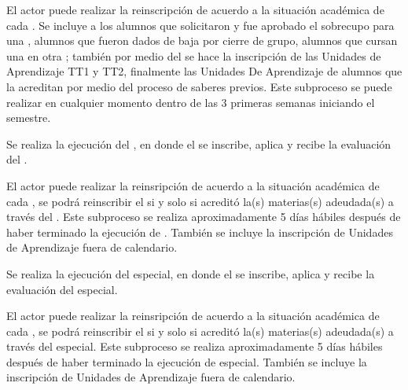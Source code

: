 \begin{PDescripcion}
\begin{enumerate}
		\Ppaso[\PSubProceso]  El actor puede realizar la reinscripción de acuerdo a la situación académica de cada . Se incluye a los alumnos que solicitaron y fue aprobado el sobrecupo para una , alumnos que fueron dados de baja por cierre de grupo, alumnos que cursan una  en otra ; también por medio del  se hace la inscripción de las Unidades de Aprendizaje TT1 y TT2, finalmente las Unidades De Aprendizaje de alumnos que la acreditan por medio del proceso de saberes previos. Este subproceso se puede realizar en cualquier momento dentro de las 3 primeras semanas iniciando el semestre. 
		
		\Ppaso[\PSubProceso]  Se realiza la ejecución del , en donde el  se inscribe, aplica y recibe la evaluación del . 
		
		\Ppaso[\PSubProceso]  El actor puede realizar la reinsripción de acuerdo a la situación académica de cada , se podrá reinscribir el  si y solo si acreditó la(s) materias(s) adeudada(s) a través del . Este subproceso se realiza aproximadamente 5 días hábiles después de haber terminado la ejecución de . También se incluye la inscripción de Unidades de Aprendizaje fuera de calendario.  
		
		\Ppaso[\PSubProceso]  Se realiza la ejecución del  especial, en donde el  se inscribe, aplica y recibe la evaluación del  especial. 
		
		\Ppaso[\PSubProceso]  El actor puede realizar la reinsripción de acuerdo a la situación académica de cada , se podrá reinscribir el  si y solo si acreditó la(s) materias(s) adeudada(s) a través del  especial. Este subproceso se realiza aproximadamente 5 días hábiles después de haber terminado la ejecución de  especial. También se incluye la inscripción de Unidades de Aprendizaje fuera de calendario.
		

\end{enumerate}
\end{PDescripcion}
